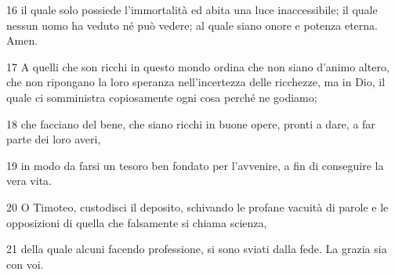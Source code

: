 \par 16 il quale solo possiede l'immortalità ed abita una luce inaccessibile; il quale nessun uomo ha veduto né può vedere; al quale siano onore e potenza eterna. Amen.
\par 17 A quelli che son ricchi in questo mondo ordina che non siano d'animo altero, che non ripongano la loro speranza nell'incertezza delle ricchezze, ma in Dio, il quale ci somministra copiosamente ogni cosa perché ne godiamo;
\par 18 che facciano del bene, che siano ricchi in buone opere, pronti a dare, a far parte dei loro averi,
\par 19 in modo da farsi un tesoro ben fondato per l'avvenire, a fin di conseguire la vera vita.
\par 20 O Timoteo, custodisci il deposito, schivando le profane vacuità di parole e le opposizioni di quella che falsamente si chiama scienza,
\par 21 della quale alcuni facendo professione, si sono sviati dalla fede. La grazia sia con voi.


